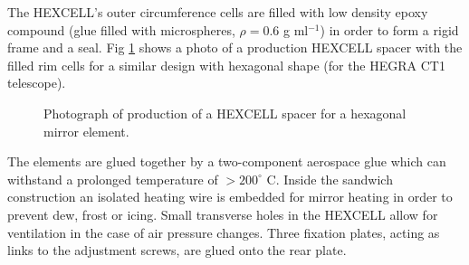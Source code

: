 
The HEXCELL's outer circumference cells are filled with low density epoxy
compound (glue filled with microspheres, $\rho =0.6$ g ml$^{-1}$) in order
to form a rigid frame and a seal. Fig \ref{fig-hexcell} shows a photo of a
production HEXCELL spacer with the filled rim cells for a similar design
with hexagonal shape (for the HEGRA CT1 telescope).

\begin{figure}[htb]
\begin{center}
\caption{Photograph of production of a HEXCELL spacer for a hexagonal mirror element.}
\label{fig-hexcell}
\end{center}
\end{figure}



The
elements are glued together by a two-component aerospace glue which can
withstand a prolonged temperature of $>200^{\circ }$ C. Inside the sandwich
construction an isolated heating wire is embedded for mirror heating in
order to prevent dew, frost or icing. Small transverse holes in the HEXCELL
allow for ventilation in the case of air pressure changes. Three fixation
plates, acting as links to the adjustment screws, are glued onto the rear
plate.

